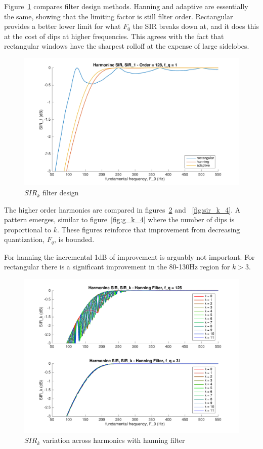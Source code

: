 \documentclass [11pt, proquest,oneside] {ganter_thesis}[2015/03/03]
\begin{document}
Figure~\ref{fig:sir_k_2} compares filter design methods.  Hanning and adaptive are essentially the same, showing that the limiting factor is still filter order.  Rectangular provides a better lower limit for what $F_0$ the SIR breaks down at, and it does this at the cost of dips at higher frequencies.  This agrees with the fact that rectangular windows have the sharpest rolloff at the expense of large sidelobes.

\begin{figure}[!ht]
  \centering
    \includegraphics[width=1\textwidth]{sir_k_2}
    \caption{$SIR_k$ filter design}\label{fig:sir_k_2}
\end{figure}

The higher order harmonics are compared in figures~\ref{fig:sir_k_3} and ~\ref{fig:sir_k_4}.  A pattern emerges, similar to figure~\ref{fig:g_k_4} where the number of dips is proportional to $k$.  These figures reinforce that improvement from decreasing quantization, $F_q$, is bounded.

For hanning the incremental 1dB of improvement is arguably not important.  For rectangular there is a significant improvement in the 80-130Hz region for $k > 3$.

\begin{figure}[!ht]
  \centering
    \includegraphics[width=.7\textwidth]{sir_k_3}
    \caption{$SIR_k$ variation across harmonics with hanning filter}\label{fig:sir_k_3}
\end{figure}
\end{document}

